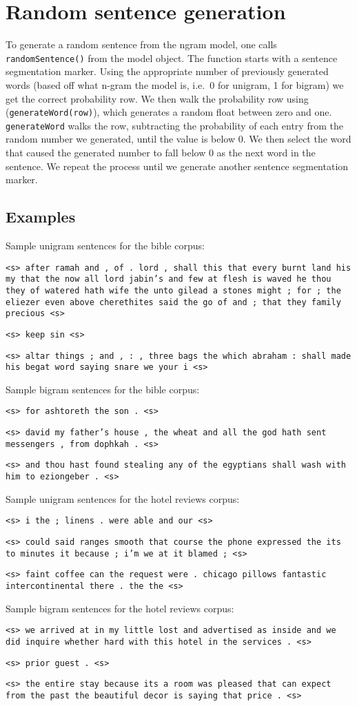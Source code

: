 \documentclass{article}
\begin{document}
\section{Random sentence generation}
To generate a random sentence from the ngram model, one calls \texttt{randomSentence()} from the model object. The function starts with a sentence segmentation marker. Using the appropriate number of previously generated words (based off what n-gram the model is, i.e.\ 0 for unigram, 1 for bigram) we get the correct probability row. We then walk the probability row using (\texttt{generateWord(row)}), which generates a random float between zero and one. \texttt{generateWord} walks the row, subtracting the probability of each entry from the random number we generated, until the value is below 0. We then select the word that caused the generated number to fall below 0 as the next word in the sentence. We repeat the process until we generate another sentence segmentation marker.

\subsection{Examples}

\begin{adjustwidth}{0.5in}{0.5in}
\setlength{\parindent}{-0.25in}
\newcommand\npar{\par}
Sample unigram sentences for the bible corpus:\npar
{\footnotesize
\texttt{<s> after ramah and , of . lord , shall this that every burnt land his my that the now all lord jabin's and few at flesh is waved he thou they of watered hath wife the unto gilead a stones might ; for ; the eliezer even above cherethites said the go of and ; that they family precious <s>}\npar
\texttt{<s> keep sin <s>}\npar
\texttt{<s> altar things ; and , : , three bags the which abraham : shall made his begat word saying snare we your i <s>}\npar
}\bigskip

Sample bigram sentences for the bible corpus:\npar
{\footnotesize
\texttt{<s> for ashtoreth the son . <s>}\npar
\texttt{<s> david my father's house , the wheat and all the god hath sent messengers , from dophkah . <s>}\npar
\texttt{<s> and thou hast found stealing any of the egyptians shall wash with him to eziongeber . <s>}\npar
}\bigskip

Sample unigram sentences for the hotel reviews corpus:\npar
{\footnotesize
\texttt{<s> i the ; linens . were able and our <s>}\npar
\texttt{<s> could said ranges smooth that course the phone expressed the its to minutes it because ; i'm we at it blamed ; <s>}\npar
\texttt{<s> faint coffee can the request were . chicago pillows fantastic intercontinental there . the the <s>}\npar
}\bigskip

Sample bigram sentences for the hotel reviews corpus:\npar
{\footnotesize
\texttt{<s> we arrived at in my little lost and advertised as inside and we did inquire whether hard with this hotel in the services . <s>}\npar
\texttt{<s> prior guest . <s>}\npar
\texttt{<s> the entire stay because its a room was pleased that can expect from the past the beautiful decor is saying that price . <s>}\npar
}\end{adjustwidth}
\end{document}
